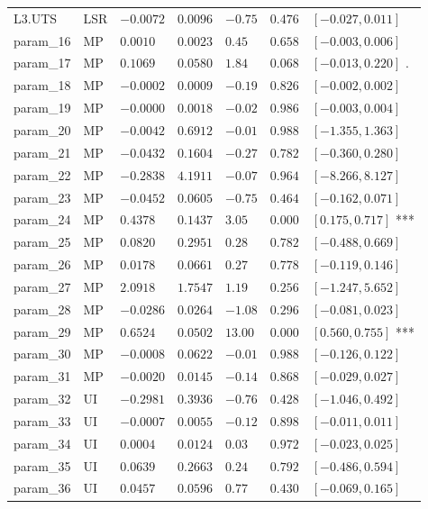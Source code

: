 \documentclass{article}
\begin{document}
\begin{longtable}{lllllll}
L3.UTS & LSR & $-0.0072$ & $0.0096$ & $-0.75$ & $0.476$ & $[-0.027, 0.011]$  \\
param\_16 & MP & $0.0010$ & $0.0023$ & $0.45$ & $0.658$ & $[-0.003, 0.006]$  \\
param\_17 & MP & $0.1069$ & $0.0580$ & $1.84$ & $0.068$ & $[-0.013, 0.220]$ . \\
param\_18 & MP & $-0.0002$ & $0.0009$ & $-0.19$ & $0.826$ & $[-0.002, 0.002]$  \\
param\_19 & MP & $-0.0000$ & $0.0018$ & $-0.02$ & $0.986$ & $[-0.003, 0.004]$  \\
param\_20 & MP & $-0.0042$ & $0.6912$ & $-0.01$ & $0.988$ & $[-1.355, 1.363]$  \\
param\_21 & MP & $-0.0432$ & $0.1604$ & $-0.27$ & $0.782$ & $[-0.360, 0.280]$  \\
param\_22 & MP & $-0.2838$ & $4.1911$ & $-0.07$ & $0.964$ & $[-8.266, 8.127]$  \\
param\_23 & MP & $-0.0452$ & $0.0605$ & $-0.75$ & $0.464$ & $[-0.162, 0.071]$  \\
param\_24 & MP & $0.4378$ & $0.1437$ & $3.05$ & $0.000$ & $[0.175, 0.717]$ *** \\
param\_25 & MP & $0.0820$ & $0.2951$ & $0.28$ & $0.782$ & $[-0.488, 0.669]$  \\
param\_26 & MP & $0.0178$ & $0.0661$ & $0.27$ & $0.778$ & $[-0.119, 0.146]$  \\
param\_27 & MP & $2.0918$ & $1.7547$ & $1.19$ & $0.256$ & $[-1.247, 5.652]$  \\
param\_28 & MP & $-0.0286$ & $0.0264$ & $-1.08$ & $0.296$ & $[-0.081, 0.023]$  \\
param\_29 & MP & $0.6524$ & $0.0502$ & $13.00$ & $0.000$ & $[0.560, 0.755]$ *** \\
param\_30 & MP & $-0.0008$ & $0.0622$ & $-0.01$ & $0.988$ & $[-0.126, 0.122]$  \\
param\_31 & MP & $-0.0020$ & $0.0145$ & $-0.14$ & $0.868$ & $[-0.029, 0.027]$  \\
param\_32 & UI & $-0.2981$ & $0.3936$ & $-0.76$ & $0.428$ & $[-1.046, 0.492]$  \\
param\_33 & UI & $-0.0007$ & $0.0055$ & $-0.12$ & $0.898$ & $[-0.011, 0.011]$  \\
param\_34 & UI & $0.0004$ & $0.0124$ & $0.03$ & $0.972$ & $[-0.023, 0.025]$  \\
param\_35 & UI & $0.0639$ & $0.2663$ & $0.24$ & $0.792$ & $[-0.486, 0.594]$  \\
param\_36 & UI & $0.0457$ & $0.0596$ & $0.77$ & $0.430$ & $[-0.069, 0.165]$  \\

\end{longtable}
\end{document}
